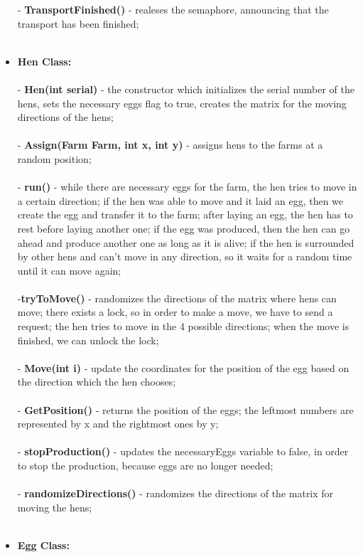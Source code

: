 \documentclass{article}
\begin{document}
\begin{itemize}
- \textbf {TransportFinished()} -  realeses the semaphore, announcing that the transport has been finished; \\ \\
\item \textbf{Hen Class:}  \\ \\
- \textbf {Hen(int serial)} - the constructor which initializes the serial number of the hens, sets the necessary eggs flag to true, creates the matrix for the moving directions of the hens; \\  \\
- \textbf {Assign(Farm Farm, int x, int y)} - assigns hens to the farms at a random position; \\  \\
-  \textbf {run()} - while there are necessary eggs for the farm, the hen tries to move in a certain direction; if the hen was able to move and it laid an egg, then we create the egg and transfer it to the farm; after laying an egg, the hen has to rest before laying another one; if the egg was produced, then the hen can go ahead and produce another one as long as it is alive; if the hen is surrounded by other hens and can't move in any direction, so it waits for a random time until it can move again; \\  \\
-\textbf  {tryToMove()} - randomizes the directions of the matrix where hens can move;
there exists a lock, so in order to make a move, we have to send a request;
the hen tries to move in the 4 possible directions; when the move is finished, we can unlock the lock; \\  \\
- \textbf {Move(int i)} - update the coordinates for the position of the egg based on the direction which the hen chooses; \\  \\
- \textbf {GetPosition()} - returns the position of the eggs; the leftmost numbers are represented by x and the rightmost ones by y; \\  \\
- \textbf {stopProduction()} - updates the necessaryEggs variable to false, in order to stop the production, because eggs are no longer needed; \\  \\
- \textbf {randomizeDirections()} - randomizes the directions of the matrix for moving the hens; \\ \\
\item \textbf{Egg Class:}  \\ \\

\end{itemize}
\end{document}
